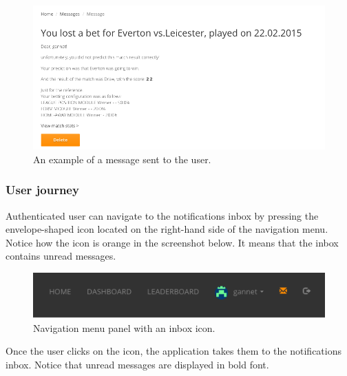 \begin{figure}[H]
	\begin{center}
		\includegraphics[width=.90\linewidth,natwidth=610,natheight=642]{impl/images/message}
		\caption{An example of a message sent to the user.} \label{fig:using: message}
	\end{center}
\end{figure}

\subsubsection*{User journey}
\label{subsec:notificationsuserjourney}
Authenticated user can navigate to the notifications inbox by pressing the envelope-shaped icon located on the right-hand side of the navigation menu. Notice how the icon is orange in the screenshot below. It means that the inbox contains unread messages.

\begin{figure}[H]
	\begin{center}
		\includegraphics[width=.90\linewidth,natwidth=610,natheight=642]{impl/images/navigationMenu}
		\caption{Navigation menu panel with an inbox icon.} \label{fig:using: navigationMenu}
	\end{center}
\end{figure}

Once the user clicks on the icon, the application takes them to the notifications inbox. Notice that unread messages are displayed in bold font.

